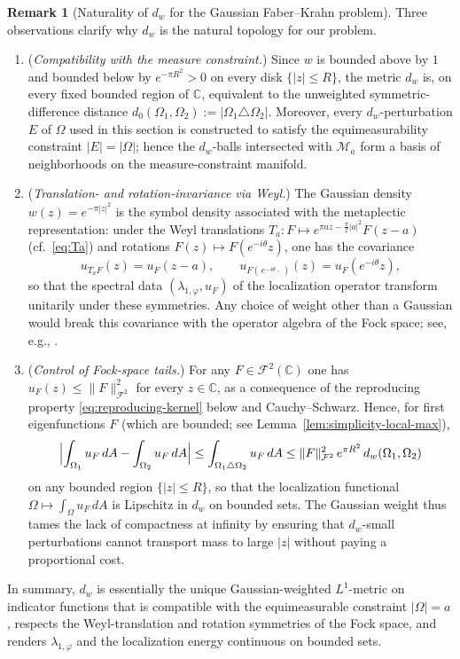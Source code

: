 \documentclass[a4paper,11pt,reqno]{amsart}
\numberwithin{equation}{section}
\theoremstyle{plain} %
\theoremstyle{definition} %
\newtheorem{remark}{Remark}[section]
\theoremstyle{remark}
\newcommand{\C}{\mathbb{C}}
\begin{document}
\begin{remark}[Naturality of \(d_w\) for the Gaussian Faber--Krahn problem]\label{rem:topology-natural}
Three observations clarify why \(d_w\) is the natural topology for our problem.

\begin{enumerate}
\item[\textnormal{(i)}] (\emph{Compatibility with the measure constraint.})
Since \(w\) is bounded above by \(1\) and bounded below by \(e^{-\pi R^2}>0\)
on every disk \(\{|z|\le R\}\), the metric \(d_w\) is, on every fixed bounded
region of \(\C\), equivalent to the unweighted symmetric-difference distance
\(d_0(\Omega_1,\Omega_2):=|\Omega_1\triangle\Omega_2|\). Moreover, every
\(d_w\)-perturbation \(E\) of \(\Omega\) used in this section is constructed
to satisfy the equimeasurability constraint \(|E|=|\Omega|\); hence the
\(d_w\)-balls intersected with \(\mathcal M_a\) form a basis of neighborhoods
on the measure-constraint manifold.

\item[\textnormal{(ii)}] (\emph{Translation- and rotation-invariance via Weyl.})
The Gaussian density \(w(z)=e^{-\pi|z|^2}\) is the symbol density associated
with the metaplectic representation: under the Weyl translations
\(T_a\colon F\mapsto e^{\pi az-\frac{\pi}{2}|a|^2}F(z-a)\) (cf.\
\eqref{eq:Ta}) and rotations \(F(z)\mapsto F(e^{-i\theta}z)\), one has the
covariance
\[
u_{T_aF}(z)=u_F(z-a),\qquad u_{F(\,e^{-i\theta}\cdot\,)}(z)=u_F(e^{-i\theta}z),
\]
so that the spectral data \((\lambda_{1,\varphi},u_F)\) of the localization
operator transform unitarily under these symmetries. Any choice of weight
other than a Gaussian would break this covariance with the operator algebra of
the Fock space; see, e.g., \cite{Folland,Grochenig}.

\item[\textnormal{(iii)}] (\emph{Control of Fock-space tails.}) For any
\(F\in \mathcal F^2(\C)\) one has \(u_F(z)\le \|F\|_{\mathcal F^2}^2\) for
every \(z\in\C\), as a consequence of the reproducing property
\eqref{eq:reproducing-kernel} below and Cauchy--Schwarz. Hence, for first
eigenfunctions \(F\) (which are bounded; see Lemma~\ref{lem:simplicity-local-max}),
\[
\Bigl|\int_{\Omega_1}u_F\,dA-\int_{\Omega_2}u_F\,dA\Bigr|
\le
\int_{\Omega_1\triangle\Omega_2}u_F\,dA
\le
\|F\|_{\mathcal F^2}^2\,e^{\pi R^2}\, d_w(\Omega_1,\Omega_2)
\]
on any bounded region \(\{|z|\le R\}\), so that the localization functional
\(\Omega\mapsto \int_\Omega u_F\,dA\) is Lipschitz in \(d_w\) on bounded
sets. The Gaussian weight thus tames the lack of compactness at infinity by
ensuring that \(d_w\)-small perturbations cannot transport mass to large
\(|z|\) without paying a proportional cost.
\end{enumerate}

In summary, \(d_w\) is essentially the unique Gaussian-weighted \(L^1\)-metric
on indicator functions that is compatible with the equimeasurable constraint
\(|\Omega|=a\), respects the Weyl-translation and rotation symmetries of the
Fock space, and renders \(\lambda_{1,\varphi}\) and the localization energy
continuous on bounded sets.
\end{remark}
\end{document}

